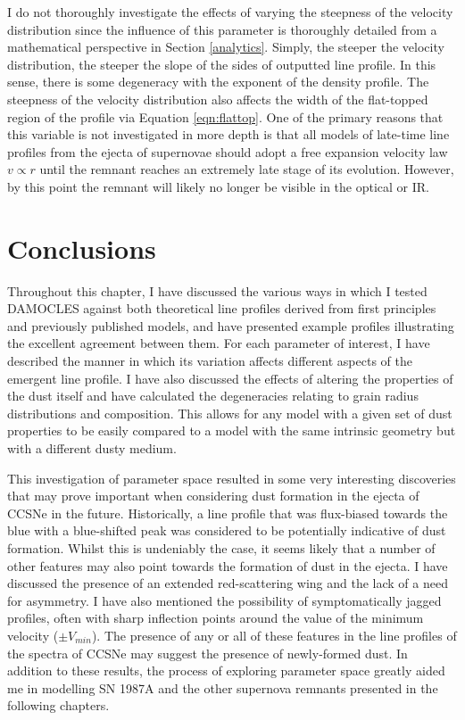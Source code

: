 \label{scn:vel_prof}

I do not thoroughly investigate the effects of varying the steepness of the velocity distribution since the influence of this parameter is thoroughly detailed from a mathematical perspective in Section \ref{analytics}.  Simply, the steeper the velocity distribution, the steeper the slope of the sides of outputted line profile.  In this sense, there is some degeneracy with the exponent of the density profile.  The steepness of the velocity distribution also affects the width of the flat-topped region of the profile via Equation \ref{eqn:flattop}.  One of the primary reasons that this variable is not investigated in more depth is that all models of late-time line profiles from the ejecta of supernovae should adopt a free expansion velocity law $v \propto r$ until the remnant reaches an extremely late stage of its evolution.  However, by this point the remnant will likely no longer be visible in the optical or IR.

\section{Conclusions}

Throughout this chapter, I have discussed the various ways in which I tested DAMOCLES against both theoretical line profiles derived from first principles and previously published models, and have presented example profiles illustrating the excellent agreement between them.  For each parameter of interest, I have described the manner in which its variation affects different aspects of the emergent line profile.  I have also discussed the effects of altering the properties of the dust itself and have calculated the degeneracies relating to grain radius distributions and composition.  This allows for any model with a given set of dust properties to be easily compared to a model with the same intrinsic geometry but with a different dusty medium.  

This investigation of parameter space resulted in some very interesting discoveries that may prove important when considering dust formation in the ejecta of CCSNe in the future.  Historically,  a line profile that was flux-biased towards the blue with a blue-shifted peak was considered to be potentially indicative of dust formation.  Whilst this is undeniably the case, it seems likely that a number of other features may also point towards the formation of dust in the ejecta.  I have discussed the presence of an extended red-scattering wing and the lack of a need for asymmetry.  I have also mentioned the possibility of symptomatically jagged profiles, often with sharp inflection points around the value of the minimum velocity ($\pm V_{min}$).  The presence of any or all of these features in the line profiles of the spectra of CCSNe may suggest the presence of newly-formed dust.  In addition to these results, the process of exploring parameter space greatly aided me in modelling SN 1987A and the other supernova remnants presented in the following chapters.





